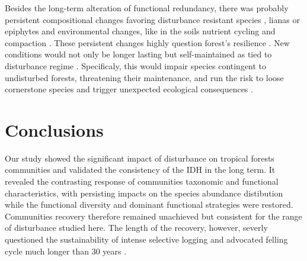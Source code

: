\documentclass[fleqn,10pt]{ArtEcoFoG} %
\theoremstyle{definition}
\theoremstyle{definition}
\theoremstyle{definition}
\theoremstyle{remark}
\begin{document}
Besides the long-term alteration of functional redundancy, there was
probably persistent compositional changes favoring disturbance resistant
species \citep{Haddad2008}, lianas or epiphytes \citep{Martin2013} and
environmental changes, like in the soils nutrient cycling and compaction
\citep{Olander2005}. These persistent changes highly question forest's
resilience \citep{Chazdon2003a}. New conditions would not only be longer
lasting but self-maintained as tied to disturbance regime
\citep{Burslem2000}. Specificaly, this would impair species contingent
to undisturbed forests, threatening their maintenance, and run the risk
to loose cornerstone species and trigger unexpected ecological
consequences \citep{Jones1994, Diaz2005, Gardner2007}.

\section{Conclusions}\label{conclusions}

Our study showed the significant impact of disturbance on tropical
forests communities and validated the consistency of the IDH in the long
term. It revealed the contrasting response of communities taxonomic and
functional characteristics, with persisting impacts on the species
abundance distibution while the functional diversity and dominant
functional strategies were restored. Communities recovery therefore
remained unachieved but consistent for the range of disturbance studied
here. The length of the recovery, however, severly questioned the
sustainability of intense selective logging and advocated felling cycle
much longer than 30 years \citep{Gourlet-Fleury2005}.



\makeatletter

\makeatother


\end{document}
